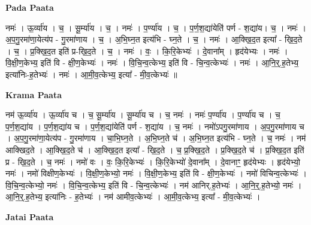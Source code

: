 \documentclass[17pt]{extarticle}
\begin{document}
\textbf{Pada Paata} \newline

नमः॑ । ऊ॒र्व्या॑य । च॒ । सू॒र्म्या॑य । च॒ । नमः॑ । प॒र्ण्या॑य । च॒ । प॒र्ण॒श॒द्या॑येति॑ पर्ण - श॒द्या॑य। च॒ । नमः॑ । अ॒प॒गु॒रमा॑णा॒येत्य॑प - गु॒रमा॑णाय । च॒ । अ॒भि॒घ्न॒त इत्य॑भि - घ्न॒ते । च॒ । नमः॑ । आ॒क्खि॒द॒त इत्या᳚ - खि॒द॒ते । च॒ । प्र॒क्खि॒द॒त इति॑ प्र-खि॒द॒ते । च॒ । नमः॑ । वः॒ । कि॒रि॒केभ्यः॑ । दे॒वाना᳚म् । हृद॑येभ्यः । नमः॑ । वि॒क्षी॒ण॒केभ्य॒ इति॑ वि - क्षी॒ण॒केभ्यः॑ । नमः॑ । वि॒चि॒न्व॒त्केभ्य॒ इति॑ वि - चि॒न्व॒त्केभ्यः॑ । नमः॑ । आ॒नि॒र्॒.ह॒तेभ्य॒ इत्या॑निः-ह॒तेभ्यः॑ । नमः॑ । आ॒मी॒व॒त्केभ्य॒ इत्या᳚ - मी॒व॒त्केभ्यः॑ ॥  \newline


\textbf{Krama Paata} \newline

नम॑ ऊ॒र्व्या॑य । ऊ॒र्व्या॑य च । च॒ सू॒र्म्या॑य । सू॒र्म्या॑य च । च॒ नमः॑ । नमः॑ प॒र्ण्या॑य । प॒र्ण्या॑य च । च॒ प॒र्ण॒श॒द्या॑य । प॒र्ण॒श॒द्या॑य च । प॒र्ण॒श॒द्या॑येति॑ पर्ण - श॒द्या॑य । च॒ नमः॑ । नमो॑ऽपगु॒रमा॑णाय । अ॒प॒गु॒रमा॑णाय च । अ॒प॒गु॒रमा॑णा॒येत्य॑प - गु॒रमा॑णाय । चा॒भि॒घ्न॒ते । अ॒भि॒घ्न॒ते च॑ । अ॒भि॒घ्न॒त इत्य॑भि - घ्न॒ते । च॒ नमः॑ । नम॑ आक्खिद॒ते । आ॒क्खि॒द॒ते च॑ । आ॒क्खि॒द॒त इत्या᳚ - खि॒द॒ते । च॒ प्र॒क्खि॒द॒ते । प्र॒क्खि॒द॒ते च॑ । प्र॒क्खि॒द॒त इति॑ प्र - खि॒द॒ते । च॒ नमः॑ । नमो॑ वः । वः॒ कि॒रि॒केभ्यः॑ । कि॒रि॒केभ्यो॑ दे॒वाना᳚म् । दे॒वानाꣳ॒॒ हृद॑येभ्यः । हृद॑येभ्यो॒ नमः॑ । नमो॑ विक्षीण॒केभ्यः॑ । वि॒क्षी॒ण॒केभ्यो॒ नमः॑ । वि॒क्षी॒ण॒केभ्य॒ इति॑ वि - क्षी॒ण॒केभ्यः॑ । नमो॑ विचिन्व॒त्केभ्यः॑ । वि॒चि॒न्व॒त्केभ्यो॒ नमः॑ । वि॒चि॒न्व॒त्केभ्य॒ इति॑ वि - चि॒न्व॒त्केभ्यः॑ । नम॑ आनिर्.ह॒तेभ्यः॑ । आ॒नि॒र्॒.ह॒तेभ्यो॒ नमः॑ । आ॒नि॒र्॒.ह॒तेभ्य॒ इत्या॑निः - ह॒तेभ्यः॑ । नम॑ आमीव॒त्केभ्यः॑ । 
आ॒मी॒व॒त्केभ्य॒ इत्या᳚ - मी॒व॒त्केभ्यः॑ । \newline

\textbf{Jatai Paata} \newline
\end{document}
